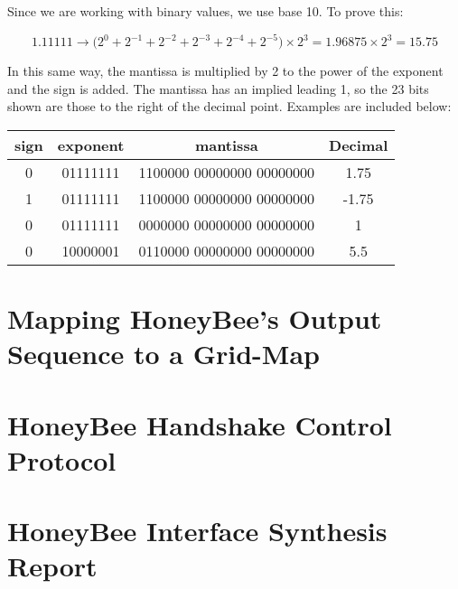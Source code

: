     Since we are working with binary values, we use base 10. To prove this: 

    $$1.11111 \rightarrow  \Big(2^0 + 2^{-1} + 2^{-2} + 2^{-3} + 2^{-4} + 2^{-5}\Big) \times 2^3   = 1.96875 \times 2^3 = 15.75$$

    In this same way, the mantissa is multiplied by 2 to the power of the exponent and the sign is added. The mantissa has an implied leading 1, so the 23 bits shown are those to the right of the decimal point. Examples are included below: \\
    \begin{table}[H]
    \begin{centering}
    \begin{tabular}{|c|c|c|c|}
    \hline
    \textbf{sign} & \textbf{exponent} & \textbf{mantissa} & \textbf{Decimal}\\
    \hline
    0 & 01111111 & 1100000 00000000 00000000 & 1.75 \\
    \hline
    1 & 01111111 & 1100000 00000000 00000000 & -1.75 \\
    \hline
    0 & 01111111 & 0000000 00000000 00000000 & 1 \\
    \hline
    0 & 10000001 & 0110000 00000000 00000000 & 5.5 \\
    \hline
    \end{tabular}
    \end{centering}
    \end{table}

\newpage 
\section{Mapping HoneyBee's Output Sequence to a Grid-Map}
\label{section:honeybee_appendix_mapping}
    

\section{HoneyBee Handshake Control Protocol}
\label{section:honeybee_appendix_handshake}
    

\section{HoneyBee Interface Synthesis Report}
\label{section:honeybee_appendix_synthesis_report}
    

